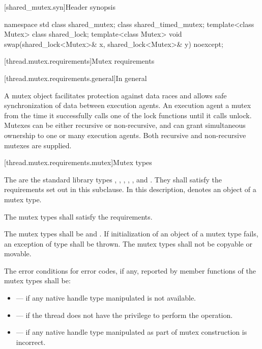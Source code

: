[shared_mutex.syn]{Header  synopsis}
%

\begin{codeblock}
namespace std {
  class shared_mutex;
  class shared_timed_mutex;
  template<class Mutex> class shared_lock;
  template<class Mutex>
    void swap(shared_lock<Mutex>& x, shared_lock<Mutex>& y) noexcept;
}
\end{codeblock}

[thread.mutex.requirements]{Mutex requirements}

[thread.mutex.requirements.general]{In general}

\pnum
A mutex object facilitates protection against data races and allows safe synchronization of
data between execution agents.
An execution agent  a mutex from the time it successfully calls one of the
lock functions until it calls unlock. Mutexes can be either recursive or non-recursive, and can
grant simultaneous ownership to one or many execution agents. Both
recursive and non-recursive mutexes are supplied.

[thread.mutex.requirements.mutex]{Mutex types}

\pnum
The  are the standard library types ,
, , ,
, and .
They shall satisfy the requirements set out in this subclause. In this description, 
denotes an object of a mutex type.

\pnum
The mutex types shall satisfy the  requirements.

\pnum
The mutex types shall be  and . If
initialization of an object of a mutex type fails, an exception of type
 shall be thrown. The mutex types shall not be copyable or movable.

\pnum
The error conditions for error codes, if any, reported by member functions of the mutex types
shall be:
\begin{itemize}
\item {} --- if any native handle type manipulated is not available.
\item {} --- if the thread does not have the
privilege to perform the operation.
\item {} --- if any native handle type manipulated as part of mutex
construction is incorrect.
\end{itemize}

